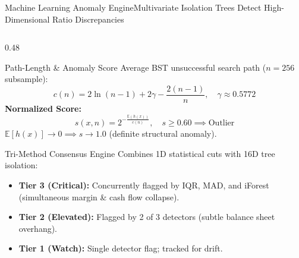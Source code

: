 \begin{frame}{Machine Learning Anomaly Engine}{Multivariate Isolation Trees Detect High-Dimensional Ratio Discrepancies}
\begin{columns}[T]
        \begin{column}{0.48\textwidth}
            \begin{mathcard}[height=2.7cm]{Path-Length \& Anomaly Score}
                \fontsize{6.3pt}{7.9pt}\selectfont
                Average BST unsuccessful search path ($n = 256$ subsample):
                \begin{equation*}
                    c(n) = 2\ln(n - 1) + 2\gamma - \frac{2(n - 1)}{n}, \quad \gamma \approx 0.5772
                \end{equation*}
                \textbf{\color{deepemerald}Normalized Score:}
                \begin{equation*}
                    s(x, n) = 2^{-\frac{\mathbb{E}(h(x))}{c(n)}}, \quad s \ge 0.60 \implies \text{Outlier}
                \end{equation*}
                $\mathbb{E}[h(x)] \to 0 \implies s \to 1.0$ (definite structural anomaly).
            \end{mathcard}

            \vspace{0.1cm}

            \begin{quantcard}[height=2.75cm]{Tri-Method Consensus Engine}
                \fontsize{6.3pt}{7.9pt}\selectfont
                Combines 1D statistical cuts with 16D tree isolation:
                \begin{itemize}
                    \setlength{\itemsep}{1.5pt}
                    \item \textbf{Tier 3 (Critical):} Concurrently flagged by IQR, MAD, and iForest (simultaneous margin \& cash flow collapse).
                    \item \textbf{Tier 2 (Elevated):} Flagged by 2 of 3 detectors (subtle balance sheet overhang).
                    \item \textbf{Tier 1 (Watch):} Single detector flag; tracked for drift.
                \end{itemize}
            \end{quantcard}
        \end{column}
    \end{columns}

    \vspace{0.1cm}
    \hfill {}
\end{frame}
